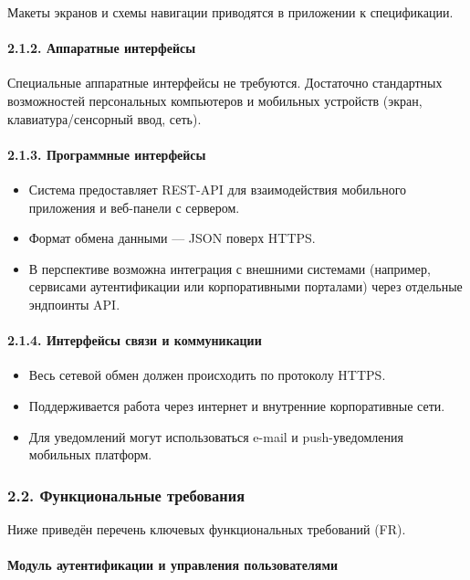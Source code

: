 \documentclass{G7-32}
\begin{document}
Макеты экранов и схемы навигации приводятся в приложении к спецификации.

\paragraph{2.1.2. Аппаратные интерфейсы}

Специальные аппаратные интерфейсы не требуются. Достаточно стандартных возможностей персональных компьютеров и мобильных устройств (экран, клавиатура/сенсорный ввод, сеть).

\paragraph{2.1.3. Программные интерфейсы}

\begin{itemize}
  \item Система предоставляет REST-API для взаимодействия мобильного приложения и веб-панели с сервером.
  \item Формат обмена данными — JSON поверх HTTPS.
  \item В перспективе возможна интеграция с внешними системами (например, сервисами аутентификации или корпоративными порталами) через отдельные эндпоинты API.
\end{itemize}

\paragraph{2.1.4. Интерфейсы связи и коммуникации}

\begin{itemize}
  \item Весь сетевой обмен должен происходить по протоколу HTTPS.
  \item Поддерживается работа через интернет и внутренние корпоративные сети.
  \item Для уведомлений могут использоваться e-mail и push-уведомления мобильных платформ.
\end{itemize}

\subsubsection*{2.2. Функциональные требования}

Ниже приведён перечень ключевых функциональных требований (FR).

\paragraph{Модуль аутентификации и управления пользователями}
\end{document}
